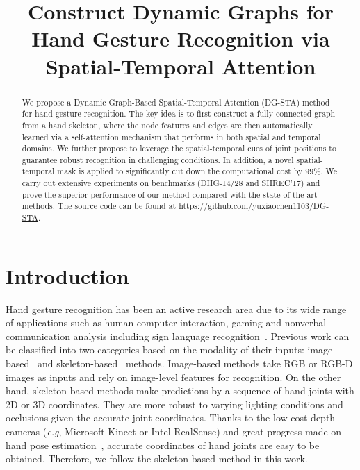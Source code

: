 \documentclass{bmvc2k}
\title{Construct Dynamic Graphs for Hand Gesture Recognition via Spatial-Temporal Attention}
\def\eg{\emph{e.g}\bmvaOneDot}
\begin{document}
\maketitle

\begin{abstract}
We propose a Dynamic Graph-Based Spatial-Temporal Attention (DG-STA) method for hand gesture recognition. The key idea is to first construct a fully-connected graph from a hand skeleton, where the node features and edges are then automatically learned via a self-attention mechanism that performs in both spatial and temporal domains. 
We further propose to leverage the spatial-temporal cues of joint positions to guarantee robust recognition in challenging conditions. 
In addition, a novel spatial-temporal mask is applied to significantly cut down the computational cost by 99\%. We carry out extensive experiments on benchmarks (DHG-14/28 and SHREC'17) and prove the superior performance of our method compared with the state-of-the-art methods. The source code can be found
at \url{https://github.com/yuxiaochen1103/DG-STA}.
\end{abstract}

\section{Introduction}
\label{sec:intro}

Hand gesture recognition has been an active research area due to its wide range of applications such as human computer interaction, gaming and nonverbal communication analysis including sign language recognition~\cite{nikam2016sign,wachs2011vision,rautaray2015vision}. Previous work can be classified into two categories based on the modality of their inputs: image-based~\cite{freeman1995orientation,molchanov2015hand,wang2015superpixel} and skeleton-based~\cite{de2016skeleton,hou2018spatial,de2017shrec,chen2017motion,nunez2018convolutional} methods. Image-based methods take RGB or RGB-D images as inputs and rely on image-level features for recognition. On the other hand, skeleton-based methods make predictions by a sequence of hand joints with 2D or 3D coordinates. They are more robust to varying lighting conditions and occlusions given the accurate joint coordinates. Thanks to the low-cost depth cameras (\eg, Microsoft Kinect or Intel RealSense) and great progress made on hand pose estimation~\cite{oberweger2015hands,oberweger2017deepprior,oberweger2015training}, accurate coordinates of hand joints are easy to be obtained. Therefore, we follow the skeleton-based method in this work.
\end{document}
